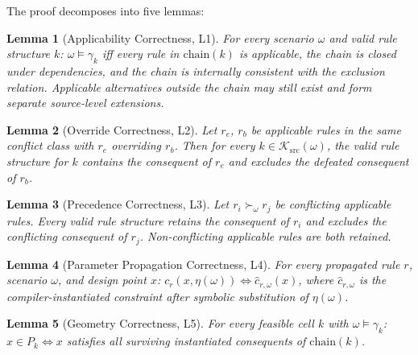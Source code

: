 ﻿\documentclass[a4paper,fleqn]{cas-dc}
\newtheorem{lemma}{Lemma}
\begin{document}
The proof decomposes into five lemmas:

\begin{lemma}[Applicability Correctness, L1]\label{lem:app}
For every scenario $\omega$ and valid rule structure $k$: $\omega\models\gamma_k$ iff every rule in $\mathrm{chain}(k)$ is applicable, the chain is closed under dependencies, and the chain is internally consistent with the exclusion relation. Applicable alternatives outside the chain may still exist and form separate source-level extensions.
\end{lemma}

\begin{lemma}[Override Correctness, L2]\label{lem:override}
Let $r_e$, $r_b$ be applicable rules in the same conflict class with $r_e$ overriding $r_b$. Then for every $k\in\mathcal{K}_{\mathrm{src}}(\omega)$, the valid rule structure for $k$ contains the consequent of $r_e$ and excludes the defeated consequent of $r_b$.
\end{lemma}

\begin{lemma}[Precedence Correctness, L3]\label{lem:prec}
Let $r_i \succ_\omega r_j$ be conflicting applicable rules. Every valid rule structure retains the consequent of $r_i$ and excludes the conflicting consequent of $r_j$. Non-conflicting applicable rules are both retained.
\end{lemma}

\begin{lemma}[Parameter Propagation Correctness, L4]\label{lem:param}
For every propagated rule $r$, scenario $\omega$, and design point $x$: $c_r(x,\eta(\omega)) \iff \hat{c}_{r,\omega}(x)$, where $\hat{c}_{r,\omega}$ is the compiler-instantiated constraint after symbolic substitution of $\eta(\omega)$.
\end{lemma}

\begin{lemma}[Geometry Correctness, L5]\label{lem:geom}
For every feasible cell $k$ with $\omega\models\gamma_k$: $x\in P_k \iff x$ satisfies all surviving instantiated consequents of $\mathrm{chain}(k)$.
\end{lemma}
\end{document}

